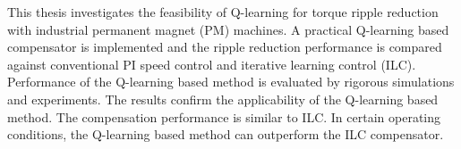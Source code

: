 \documentclass[english, 12pt, a4paper, elec, utf8, a-2b, online]{aaltothesis}
\date{25.6.2020}
\begin{document}
\makecoverpage

\makecopyrightpage






\begin{abstractpage}[english]
This thesis investigates the feasibility of Q-learning for torque ripple reduction with industrial permanent magnet (PM) machines. A practical Q-learning based compensator is implemented and the ripple reduction performance is compared against conventional PI speed control and iterative learning control (ILC). Performance of the Q-learning based method is evaluated by rigorous simulations and experiments. The results confirm the applicability of the Q-learning based method. The compensation performance is similar to ILC. In certain operating conditions, the Q-learning based method can outperform the ILC compensator.
\end{abstractpage}

\end{document}
